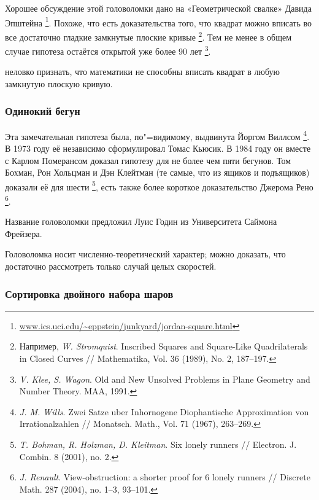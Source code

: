 \documentclass[twoside]{book}
\begin{document}
Хорошее обсуждение этой головоломки дано на «Геометрической свалке» Давида Эпштейна%
\footnote{\href{http://www.ics.uci.edu/~eppstein/junkyard/jordan-square.html}{\url{www.ics.uci.edu/~eppstein/junkyard/jordan-square.html}}}.
Похоже, что есть доказательства того, что квадрат можно вписать во все достаточно гладкие замкнутые плоские кривые%
\footnote{Например, \emph{W. Stromquist}. Inscribed Squares and Square-Like Quadrilaterals in Closed Curves /\!/ {Mathematika}, Vol. 36 (1989), No. 2, 187--197.}.
Тем не менее в общем случае гипотеза остаётся открытой уже более 90 лет%
\footnote{\emph{V. Klee, S. Wagon}. {Old and New Unsolved Problems in Plane Geometry and Number Theory.} MAA, 1991.}.

\medskip

 неловко признать, что математики не способны вписать квадрат в любую замкнутую плоскую кривую.

\subsubsection*{Одинокий бегун}

Эта замечательная гипотеза была, по"=видимому, выдвинута Йоргом Виллсом%
\footnote{\emph{J. M. Wills}. Zwei Satze uber Inhornogene Diophantische Approximation von Irrational\-zahlen /\!/ {Monatsch. Math.}, Vol. 71 (1967), 263--269.}.
В 1973 году её независимо сформулировал Томас Кьюсик.
В 1984 году он вместе с Карлом Померансом доказал гипотезу для не более чем пяти бегунов.
Том Бохман, Рон Хольцман и Дэн Клейтман (те самые, что из ящиков и подъящиков) доказали её для шести%
\footnote{\emph{T. Bohman, R. Holzman, D. Kleitman}.
Six lonely runners /\!/ {Electron. J. Combin.} 8 (2001), no. 2.
},
есть также более короткое доказательство Джерома Рено%
\footnote{\emph{J. Renault}. View-obstruction: a shorter proof for 6 lonely runners /\!/ {Discrete Math.} 287 (2004), no. 1--3, 93--101.}.

\medskip

Название головоломки предложил Луис Годин из Университета Саймона Фрейзера.

Головоломка носит численно-теоретический характер;
можно доказать, что достаточно рассмотреть только случай целых скоростей.

\subsubsection*{Сортировка двойного набора шаров}
\end{document}
